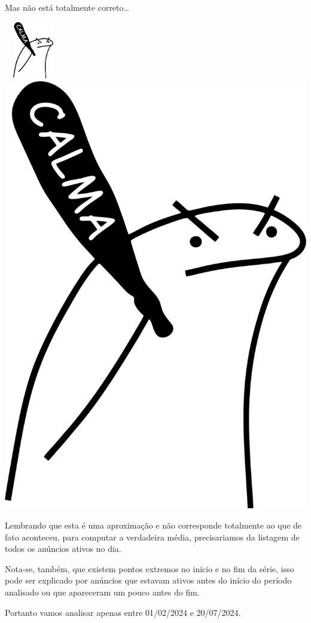 \documentclass[
]{article}
\let\oldincludegraphics\includegraphics
\renewcommand{\includegraphics}[2][]{ \ifthenelse{ \equal{#1}{} } { \oldincludegraphics[width=2.5cm,height=2.5cm,keepaspectratio=true]{#2} } { \oldincludegraphics[#1]{#2} } }
\begin{document}
Mas não está totalmente correto\ldots{}

\includegraphics{./images/flork-exercer-a-calma.jpg}

Lembrando que esta é uma aproximação e não corresponde totalmente ao que
de fato aconteceu, para computar a verdadeira média, precisariamos da
listagem de todos os anúncios ativos no dia.

Nota-se, também, que existem pontos extremos no início e no fim da
série, isso pode ser explicado por anúncios que estavam ativos antes do
início do período analisado ou que apareceram um pouco antes do fim.

Portanto vamos analisar apenas entre 01/02/2024 e 20/07/2024.
\end{document}

